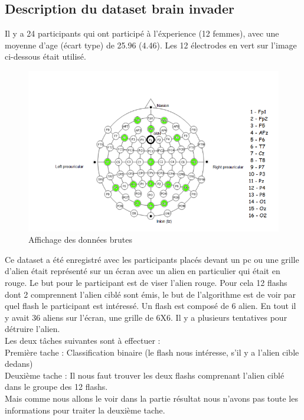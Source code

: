 \documentclass{article}[12pt]
\begin{document}
\subsection{Description du dataset brain invader}
Il y a 24 participants qui ont participé à l’éxperience (12 femmes), avec une moyenne d'age (écart type) de 25.96 (4.46). Les 12 électrodes en vert sur l'image ci-dessous était utilisé.
\begin{figure}[H]
\begin{center}
\includegraphics[scale=0.4]{images/situation_capteur.png}
\end{center}
\caption{Affichage des données brutes}
\end{figure}

Ce dataset a été enregistré avec les participants placés devant un pc ou une grille d'alien était représenté sur un écran avec un alien en particulier qui était en rouge. Le but pour le participant est de viser l'alien rouge. Pour cela 12 flashs dont 2 comprennent l'alien ciblé sont émis, le but de l'algorithme est de voir par quel flash le participant est intéressé. Un flash est composé de 
6 alien. En tout il y avait 36 aliens sur l’écran, une grille de 6X6. Il y a plusieurs tentatives pour détruire l'alien.\\
Les deux tâches suivantes sont à effectuer :\\
Première tache : Classification binaire (le flash nous intéresse, s'il y a l'alien cible dedans)\\
Deuxième tache : Il nous faut trouver les deux flashs comprenant l'alien ciblé dans le groupe des 12 flashs.\\
Mais comme nous allons le voir dans la partie résultat nous n'avons pas toute les informations pour traiter la deuxième tache.
\end{document}
